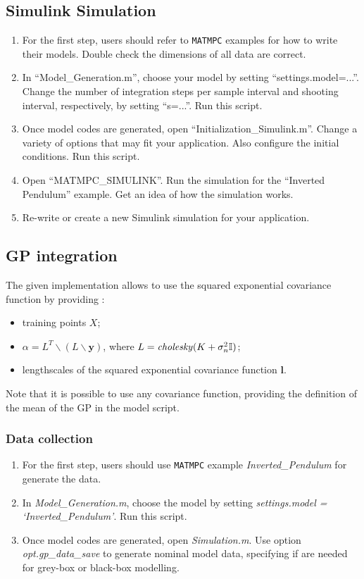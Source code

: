 \documentclass{article}
\newcommand{\software}[1]{{\tt#1}}
\begin{document}
\subsection{Simulink Simulation}
\begin{enumerate}
	\item For the first step, users should refer to \software{MATMPC} examples for how to write their models. Double check the dimensions of all data are correct.
	\item In ``Model\_Generation.m'', choose your model by setting ``settings.model=...''. Change the number of integration steps per sample interval and shooting interval, respectively, by setting ``s=...''. Run this script.
	\item Once model codes are generated, open ``Initialization\_Simulink.m''. Change a variety of options that may fit your application. Also configure the initial conditions. Run this script.
	\item Open ``MATMPC\_SIMULINK''. Run the simulation for the ``Inverted Pendulum'' example. Get an idea of how the simulation works.
	\item Re-write or create a new Simulink simulation for your application.
\end{enumerate}

\subsection{GP integration}\label{subsec:gpint}
The given implementation allows to use the squared exponential covariance function by providing \cite[p. 16-19]{rasmussen2003gaussian}:
\begin{itemize}
    \item training points $X$;
    \item $\alpha = L^T\backslash(L\backslash\mathbf{y})$, where $L = \text{\textit{cholesky}}(K+\sigma_n^2 \mathbb{I})$;
    \item lengthscales of the squared exponential covariance function $\mathbf{l}$.
\end{itemize} 

Note that it is possible to use any covariance function, providing the definition of the mean of the GP in the model script.

\subsubsection{Data collection}
\begin{enumerate}
	\item For the first step, users should use \software{MATMPC} example \textit{Inverted\_Pendulum} for generate the data.
	\item In \textit{Model\_Generation.m}, choose the model by setting \textit{settings.model = `Inverted\_Pendulum'}. Run this script.
	\item Once model codes are generated, open \textit{Simulation.m}. Use option \textit{opt.gp\_data\_save} to generate nominal model data, specifying if are needed for grey-box or black-box modelling.
\end{enumerate}
\end{document}
